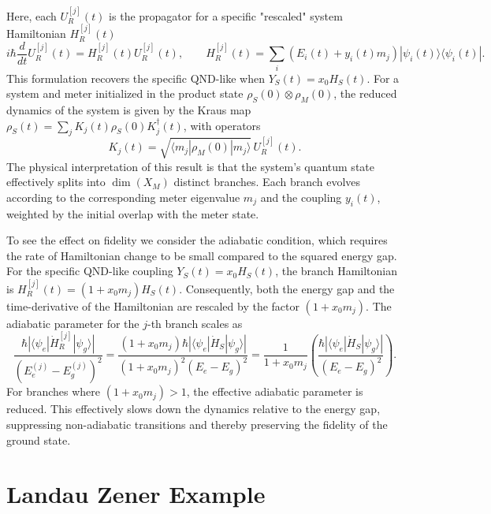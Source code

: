Here, each $U_R^{[j]}(t)$ is the propagator for a specific "rescaled" system Hamiltonian $H_R^{[j]}(t)$
\begin{equation}
    i\hbar \frac{d}{dt} U_R^{[j]}(t) = H_R^{[j]}(t) U_R^{[j]}(t), \qquad H_R^{[j]}(t) = \sum_i (E_i(t) + y_i(t)m_j) |\psi_i(t)\rangle\langle\psi_i(t)|.
\end{equation}
\qquad This formulation recovers the specific QND-like when $Y_S(t) = x_0 H_S(t)$. For a system and meter initialized in the product state $\rho_S(0) \otimes \rho_M(0)$, the reduced dynamics of the system is given by the Kraus map $\rho_S(t) = \sum_j K_j(t) \rho_S(0) K_j^\dagger(t)$, with operators
\begin{equation}
    K_j(t) = \sqrt{\langle m_j | \rho_M(0) | m_j \rangle} \, U_R^{[j]}(t).
\end{equation}
\qquad The physical interpretation of this result is that the system's quantum state effectively splits into $\dim(X_M)$ distinct branches. Each branch evolves according to the corresponding meter eigenvalue $m_j$ and the coupling $y_i(t)$, weighted by the initial overlap with the meter state.

\qquad To see the effect on fidelity we consider the adiabatic condition, which requires the rate of Hamiltonian change to be small compared to the squared energy gap. For the specific QND-like coupling $Y_S(t) = x_0 H_S(t)$, the branch Hamiltonian is $H_R^{[j]}(t) = (1 + x_0 m_j) H_S(t)$. Consequently, both the energy gap and the time-derivative of the Hamiltonian are rescaled by the factor $(1 + x_0 m_j)$. The adiabatic parameter for the $j$-th branch scales as
\begin{equation}
    \frac{\hbar |\langle \psi_e | \dot{H}_R^{[j]} | \psi_g \rangle|}{(E_e^{(j)} - E_g^{(j)})^2} 
    = \frac{(1+x_0 m_j)\hbar |\langle \psi_e | \dot{H}_S | \psi_g \rangle|}{(1+x_0 m_j)^2 (E_e - E_g)^2} 
    = \frac{1}{1+x_0 m_j} \left( \frac{\hbar |\langle \psi_e | \dot{H}_S | \psi_g \rangle|}{(E_{e} - E_{g})^2} \right).
\end{equation}
For branches where $(1 + x_0 m_j) > 1$, the effective adiabatic parameter is reduced. This effectively slows down the dynamics relative to the energy gap, suppressing non-adiabatic transitions and thereby preserving the fidelity of the ground state.


\section{Landau Zener Example}


